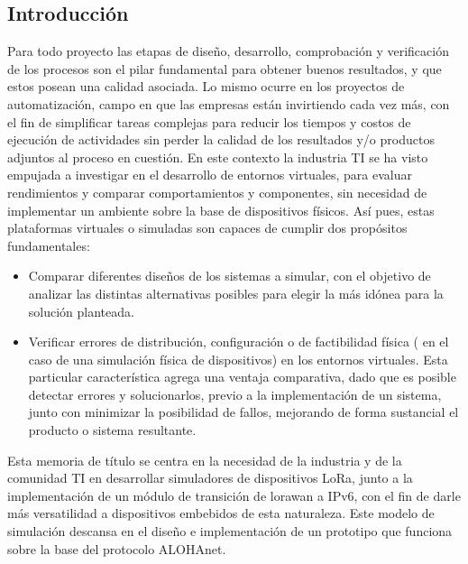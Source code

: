 \begin{justify}
\chapter{Introducción}
%
Para todo proyecto las etapas de diseño, desarrollo, comprobación y verificación de los procesos son el pilar fundamental para obtener buenos resultados, y que estos posean una calidad asociada. Lo mismo ocurre en los proyectos de automatización, campo en que las empresas están invirtiendo cada vez más, con el fin de simplificar tareas complejas para reducir los tiempos y costos de ejecución de actividades sin perder la calidad de los resultados y/o productos adjuntos al proceso en cuestión. En este contexto la industria TI se ha visto empujada a investigar en el desarrollo de entornos virtuales, para evaluar rendimientos y comparar comportamientos y componentes, sin necesidad de implementar un ambiente sobre la base de dispositivos físicos. Así pues, estas plataformas virtuales o simuladas son capaces de cumplir dos propósitos fundamentales:\\
\begin{itemize}
\item Comparar diferentes diseños de los sistemas a simular, con el objetivo de analizar las distintas alternativas posibles para elegir la más idónea para la solución planteada.
\item Verificar errores de distribución, configuración o de factibilidad física ( en el caso de una simulación física de dispositivos) en los entornos virtuales. Esta particular característica agrega una ventaja comparativa, dado que es posible detectar errores y solucionarlos, previo a la implementación de un sistema, junto con minimizar la posibilidad de fallos, mejorando de forma sustancial el producto o sistema resultante.
\end{itemize}
Esta memoria de título se centra en la necesidad de la industria y de la comunidad TI en desarrollar simuladores de dispositivos LoRa, junto a la implementación de un módulo de transición de \gls{lorawan} a IPv6, con el fin de darle más versatilidad a dispositivos embebidos de esta naturaleza. Este modelo de simulación descansa en el diseño e implementación de un prototipo que funciona sobre la base del protocolo ALOHAnet.


\end{justify}
